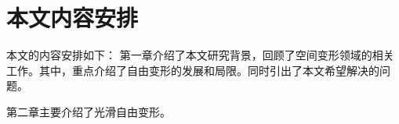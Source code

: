 



\section{本文内容安排}
本文的内容安排如下：
第一章介绍了本文研究背景，回顾了空间变形领域的相关工作。其中，重点介绍了自由变形的发展和局限。同时引出了本文希望解决的问题。

第二章主要介绍了光滑自由变形\cite{Cui15}。
